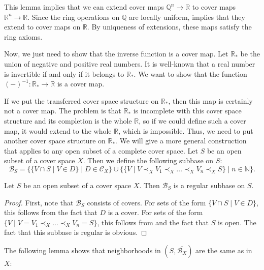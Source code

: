 \documentclass[reqno]{amsart}
\theoremstyle{definition}
\theoremstyle{remark}
\numberwithin{figure}{section}
\newcommand{\rb}{\prec}
\begin{document}
This lemma implies that we can extend cover maps $\mathbb{Q}^n \to \mathbb{R}$ to cover maps $\mathbb{R}^n \to \mathbb{R}$.
Since the ring operations on $\mathbb{Q}$ are locally uniform,  implies that they extend to cover maps on $\mathbb{R}$.
By uniqueness of extensions, these maps satisfy the ring axioms.

Now, we just need to show that the inverse function is a cover map.
Let $\mathbb{R}_*$ be the union of negative and positive real numbers.
It is well-known that a real number is invertible if and only if it belongs to $\mathbb{R}_*$.
We want to show that the function $(-)^{-1} : \mathbb{R}_* \to \mathbb{R}$ is a cover map.

If we put the transferred cover space structure on $\mathbb{R}_*$, then this map is certainly not a cover map.
The problem is that $\mathbb{R}_*$ is incomplete with this cover space structure and its completion is the whole $\mathbb{R}$,
so if we could define such a cover map, it would extend to the whole $\mathbb{R}$, which is impossible.
Thus, we need to put another cover space structure on $\mathbb{R}_*$.
We will give a more general construction that applies to any open subset of a complete cover space.
Let $S$ be an open subset of a cover space $X$.
Then we define the following subbase on $S$:
\[ \mathcal{B}_S = \{ \{ V \cap S \mid V \in D \} \mid D \in \mathcal{C}_X \} \cup \{ \{ V \mid V \rb_X V_1 \rb_X \ldots \rb_X V_n \rb_X S \} \mid n \in \mathbb{N} \}. \]

\begin{lem}
Let $S$ be an open subset of a cover space $X$.
Then $\mathcal{B}_S$ is a regular subbase on $S$.
\end{lem}
\begin{proof}
First, note that $\mathcal{B}_S$ consists of covers.
For sets of the form $\{ V \cap S \mid V \in D \}$, this follows from the fact that $D$ is a cover.
For sets of the form $\{ V \mid V = V_1 \rb_X \ldots \rb_X V_n = S \}$, this follows from  and the fact that $S$ is open.
The fact that this subbase is regular is obvious.
\end{proof}

The following lemma shows that neighborhoods in $(S,\overline{\mathcal{B}_X})$ are the same as in $X$:
\end{document}
